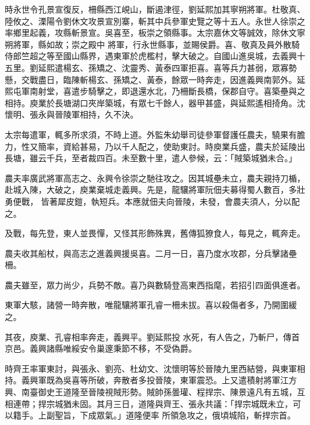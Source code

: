 \begin{pinyinscope}
 時永世令孔景宣復反，柵縣西江峴山，斷遏津徑，劉延熙加其寧朔將軍。杜敬真、陸攸之、溧陽令劉休文攻景宣別寨，斬其中兵參軍史覽之等十五人。永世人徐崇之率鄉里起義，攻縣斬景宣。吳喜至，板崇之領縣事。太宗嘉休文等誠效，除休文寧朔將軍，縣如故；崇之殿中
 將軍，行永世縣事，並賜侯爵。喜、敬真及員外散騎侍郎竺超之等至國山縣界，遇東軍於虎檻村，擊大破之。自國山進吳城，去義興十五里。劉延熙遣楊玄、孫矯之、沈靈秀、黃泰四軍拒喜。喜等兵力甚弱，眾寡勢懸，交戰盡日，臨陳斬楊玄、孫矯之、黃泰，餘眾一時奔走，因進義興南郭外。延熙屯軍南射堂，喜遣步騎擊之，即退還水北，乃柵斷長橋，保郡自守。喜築壘與之相持。庾業於長塘湖口夾岸築城，有眾七千餘人，器甲甚盛，與延熙遙相掎角。沈
 懷明、張永與晉陵軍相持，久不決。



 太宗每遣軍，輒多所求須，不時上道。外監朱幼舉司徒參軍督護任農夫，驍果有膽力，性又簡率，資給甚易，乃以千人配之，使助東討。時庾業兵盛，農夫於延陵出長塘，雖云千兵，至者裁四百。未至數十里，遣人參候，云：「賊築城猶未合。」



 農夫率廣武將軍高志之、永興令徐崇之馳往攻之。因其城壘未立，農夫親持刀楯，赴城入陳，大破之，庾業棄城走義興。先是，龍驤將軍阮佃夫募得蜀人數百，多壯勇便戰，
 皆著犀皮鎧，執短兵。本應就佃夫向晉陵，未發，會農夫須人，分以配之。



 及戰，每先登，東人並畏憚，又怪其形飾殊異，舊傳狐獠食人，每見之，輒奔走。



 農夫收其船杖，與高志之進義興援吳喜。二月一日，喜乃度水攻郡，分兵擊諸壘柵。



 農夫雖至，眾力尚少，兵勢不敵。喜乃與數騎登高東西指麾，若招引四面俱進者。



 東軍大駭，諸營一時奔散，唯龍驤將軍孔睿一柵未拔。喜以殺傷者多，乃開圍緩之。



 其夜，庾業、孔睿相率奔走，義興平。劉延熙投
 水死，有人告之，乃斬尸，傳首京邑。義興諸縣唯綏安令巢邃秉節不移，不受偽爵。



 時齊王率軍東討，與張永、劉亮、杜幼文、沈懷明等於晉陵九里西結營，與東軍相持。義興軍既為吳喜等所破，奔散者多投晉陵，東軍震恐。上又遣積射將軍江方興、南臺御史王道隆至晉陵視賊形勢。賊帥孫曇瓘、程捍宗、陳景遠凡有五城，互相連帶；捍宗城猶未固。其月三日，道隆與齊王、張永共議：「捍宗城既未立，可以籍手。上副聖旨，下成眾氣。」道隆便率
 所領急攻之，俄頃城陷，斬捍宗首。




\end{pinyinscope}
